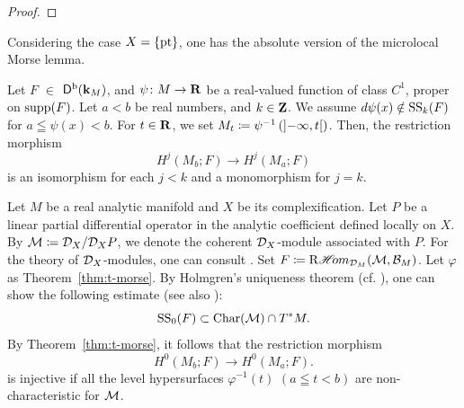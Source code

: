 \begin{proof}

\end{proof}

Considering the case \(X=\{\pt\}\), 
one has the absolute version of the microlocal Morse lemma.

\begin{Theorem+}\label{thm:t-morse}
  Let \(F\) \(\in\) \(\Dompb(\kk_M)\), and 
  \(\psi\colon M\to \rr\) be a real-valued function of 
  class \(C^1\), 
  proper on \(\supp(F)\). 
  Let \(a<b\) be real numbers, and \(k\in\zz\).
  We assume \(d\psi(x)\notin \muS[k](F)\) for \(
    a\leqq \psi(x)<b
  \). For \(t\in \rr\), we set \(
    M_t\coloneqq\psi^{-1}\left(\lopen-\infty,t\ropen\right)
  \). 
  Then, the restriction morphism \[
    H^{j}(M_{b};F)\to H^{j}(M_{a};F)
  \]
  is an isomorphism for each \(j< k\) and 
  a monomorphism for \(j=k\).
\end{Theorem+}

\begin{Example+}
  Let \(M\) be a real analytic manifold 
  and \(X\) be its complexification.
  Let \(P\) be a linear partial differential operator 
  in the analytic coefficient defined locally on \(X\). 
  By \(\cM\coloneqq \cD_{X}/\cD_{X}P\), we denote 
  the coherent \(\cD_{X}\)-module associated with \(P\). 
  For the theory of \(\cD_X\)-modules, one can consult \cite{Kas03}.
  Set \(F\coloneqq \RHOM_{\cD_{M}}(\cM,\cB_{M})\). 
  Let \(\varphi\) as Theorem~\ref{thm:t-morse}.
  By Holmgren's uniqueness theorem (cf. \cite[Theorem~8.6.5]{Hor83}), 
  one can show the following estimate (see also \cite[Example 3.8~(iv)]{KMS03a}):
  \[
    \muS[0](F)\subset\Char(\cM)\cap \cotb[M].
  \]
  By Theorem~\ref{thm:t-morse}, 
  it follows that the restriction morphism
  \[
    H^{0}(M_{b};F)\to H^{0}(M_{a};F).
  \]
  is injective if all the level hypersurfaces \(\varphi^{-1}(t)\) \((a\leqq t < b)\) are non-characteristic 
  for \(\cM\).
\end{Example+}

